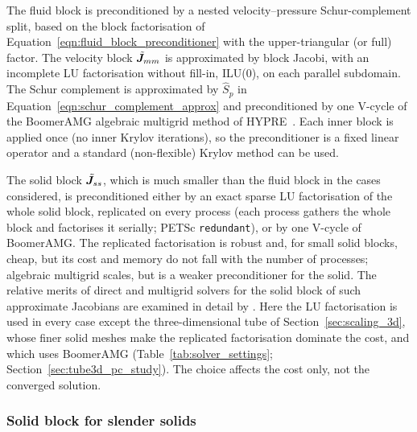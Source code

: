 The fluid block is preconditioned by a nested velocity--pressure Schur-complement split, based on the block factorisation of Equation~\eqref{eqn:fluid_block_preconditioner} with the upper-triangular (or full) factor.
The velocity block $\tilde{\boldsymbol{J}}_{mm}$ is approximated by block Jacobi, with an incomplete LU factorisation without fill-in, ILU(0), on each parallel subdomain.
The Schur complement is approximated by $\hat{S}_p$ in Equation~\eqref{eqn:schur_complement_approx} and preconditioned by one V-cycle of the BoomerAMG algebraic multigrid method of HYPRE~\citep{hypre}.
Each inner block is applied once (no inner Krylov iterations), so the preconditioner is a fixed linear operator and a standard (non-flexible) Krylov method can be used.

The solid block $\tilde{\boldsymbol{J}}_{ss}$, which is much smaller than the fluid block in the cases considered, is preconditioned either by an exact sparse LU factorisation of the whole solid block, replicated on every process (each process gathers the whole block and factorises it serially; PETSc \texttt{redundant}), or by one V-cycle of BoomerAMG.
The replicated factorisation is robust and, for small solid blocks, cheap, but its cost and memory do not fall with the number of processes; algebraic multigrid scales, but is a weaker preconditioner for the solid.
The relative merits of direct and multigrid solvers for the solid block of such approximate Jacobians are examined in detail by \citet{Cardiff2026}.
Here the LU factorisation is used in every case except the three-dimensional tube of Section~\ref{sec:scaling_3d}, whose finer solid meshes make the replicated factorisation dominate the cost, and which uses BoomerAMG (Table~\ref{tab:solver_settings}; Section~\ref{sec:tube3d_pc_study}).
The choice affects the cost only, not the converged solution.

\subsubsection{Solid block for slender solids}
\label{sec:solid_block}

